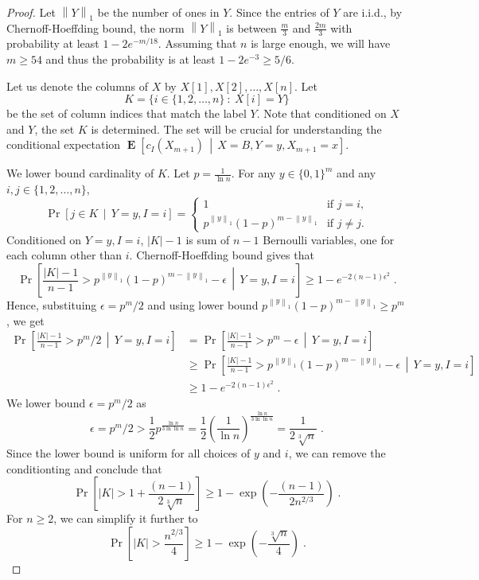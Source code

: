 \documentclass[10pt]{article}
\newcommand{\norm}[1]{\left\| #1 \right\|}
\DeclareMathOperator{\Exp}{\mathbf{E}}
\begin{document}
\begin{proof}
Let $\norm{Y}_1$ be the number of ones in $Y$. Since the entries of $Y$ are
i.i.d., by Chernoff-Hoeffding bound, the norm $\norm{Y}_1$ is between
$\frac{m}{3}$ and $\frac{2m}{3}$ with probability at least $1 - 2e^{-m/18}$.
Assuming that $n$ is large enough, we will have $m \ge 54$ and thus the
probability is at least $1 - 2e^{-3} \ge 5/6$.

Let us denote the columns of $X$ by $X[1], X[2], \dots, X[n]$.
Let
$$
K = \{ i \in \{1,2,\dots,n\} ~:~ X[i] = Y \}
$$
be the set of column indices that match the label $Y$. Note that conditioned on
$X$ and $Y$, the set $K$ is determined. The set will be crucial for
understanding the conditional expectation $\Exp\left[ c_I(X_{m+1}) \, \middle| \,
X = B, Y = y, X_{m+1} = x \right]$.

We lower bound cardinality of $K$. Let $p = \frac{1}{\ln n}$. For any $y \in
\{0,1\}^m$ and any $i,j \in \{1,2,\dots,n\}$,
$$
\Pr \left[ j \in K  \, \middle| \, Y = y, I = i \right]
=
\begin{cases}
1 & \text{if $j = i$,} \\
p^{\norm{y}_1} (1 - p)^{m - \norm{y}_1} & \text{if $j \neq j$.}
\end{cases}
$$
Conditioned on $Y = y, I=i$, $|K|-1$ is sum of $n-1$ Bernoulli variables, one
for each column other than $i$. Chernoff-Hoeffding bound gives that
$$
\Pr \left[ \frac{|K| - 1}{n - 1} > p^{\norm{y}_1} (1 - p)^{m - \norm{y}_1} - \epsilon \, \middle| \,  Y = y, I = i  \right] \ge 1 - e^{-2(n-1) \epsilon^2} \; .
$$
Hence, substituing $\epsilon = p^m/2$ and using lower bound $p^{\norm{y}_1} (1 -
p)^{m - \norm{y}_1} \ge p^m$, we get
\begin{align*}
\Pr \left[ \frac{|K| - 1}{n - 1} > p^m/2  \, \middle| \,  Y = y, I = i  \right]
& = \Pr \left[ \frac{|K| - 1}{n - 1} > p^m - \epsilon  \, \middle| \,  Y = y, I = i  \right] \\
& \ge \Pr \left[ \frac{|K| - 1}{n - 1} > p^{\norm{y}_1} (1 - p)^{m - \norm{y}_1} - \epsilon  \, \middle| \,  Y = y, I = i  \right] \\
& \ge 1 - e^{-2(n-1) \epsilon^2} \; .
\end{align*}
We lower bound $\epsilon = p^m/2$ as
$$
\epsilon = p^m/2 > \frac{1}{2} p^\frac{\ln n}{3 \ln \ln n} = \frac{1}{2} \left( \frac{1}{\ln n} \right)^\frac{\ln n}{3 \ln \ln n} = \frac{1}{2\sqrt[3]{n}} \; .
$$
Since the lower bound is uniform for all choices of $y$ and $i$, we can remove
the conditionting and conclude that
$$
\Pr \left[ |K| > 1 + \frac{(n-1)}{2\sqrt[3]{n}} \right] \ge 1 - \exp \left(- \frac{(n-1)}{2 n^{2/3}} \right) \; .
$$
For $n \ge 2$, we can simplify it further to
$$
\Pr \left[ |K| > \frac{n^{2/3}}{4} \right] \ge 1 - \exp \left(- \frac{\sqrt[3]{n}}{4} \right) \; .
$$


\end{proof}
\end{document}
